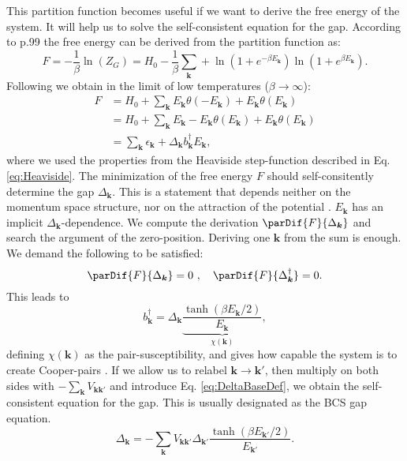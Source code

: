 \documentclass[../main.tex]{subfile}
\begin{document}
This partition function becomes useful if we want to derive the free energy of the system. It will help us to solve the self-consistent equation for the gap.
According to \cite{FuchsBaugaertel2023} p.99 the free energy can be derived from the partition function as:
\[
    F = -\frac{1}{\beta}\ln(Z_G) = H_0 -\frac{1}{\beta}\sum_{\bm{k}} + \ln\left(1 + e^{-\beta E_{\bm{k}}}\right)\ln\left(1 + e^{\beta E_{\bm{k}}}\right).
\]
Following \cite{FossheimSudbo2004} we obtain in the limit of low temperatures ($\beta\rightarrow \infty$):
\begin{align*}
    F &= H_0 + \sum_{\bm{k}} E_{\bm{k}} \theta\left(-E_{\bm{k}}\right) + E_{\bm{k}} \theta\left(E_{\bm{k}}\right)\\
      &= H_0 + \sum_{\bm{k}} E_{\bm{k}} - E_{\bm{k}}\theta\left(E_{\bm{k}}\right) + E_{\bm{k}} \theta\left(E_{\bm{k}}\right)\\
      &= \sum_{\bm{k}} \epsilon_{\bm{k}} + \Delta_{\bm{k}}b_{\bm{k}}^{\dagger} E_{\bm{k}},
\end{align*}
where we used the properties from the Heaviside step-function described in Eq. \ref{eq:Heaviside}.
The minimization of the free energy $F$ should self-consitently determine the gap $\Delta_{\bm{k}}$. This is a statement that depends neither on the momentum space structure,
nor on the attraction of the potential \cite{FossheimSudbo2004}. $E_{\bm{k}}$ has an implicit $\Delta_{\bm{k}}$-dependence.
We compute the derivation $\parDif{F}{\Delta_{\bm{k}}}$ and search the argument of the zero-position. Deriving one $\bm{k} $ from the sum is enough. We demand the following
to be satisfied:
\begin{equation}
    \parDif{F}{\Delta_{\bm{k}}} = 0 ~,~~~ \parDif{F}{\Delta_{\bm{k}}^{\dagger}} = 0.
\end{equation}
This leads to
\begin{equation*}
    b_{\bm{k}}^{\dagger} = \Delta_{\bm{k}} \underbrace{\frac{\tanh(\beta E_{\bm{k}}/2)}{E_{\bm{k}}}}_{\chi(\bm{k})},
\end{equation*}
defining $\chi(\bm{k})$ as the pair-susceptibility, and gives how capable the system is to create Cooper-pairs \cite{FossheimSudbo2004}. If we allow us to relabel 
$\bm{k}\rightarrow\bm{k}'$, then multiply on both sides
with $-\sum_{\bm{k}} V_{\bm{k}\bm{k}'}$ and introduce Eq. \ref{eq:DeltaBaseDef}, we obtain the self-consistent equation for the gap. This is usually designated as the BCS gap equation.
\begin{equation}\label{eq:BCS_gap_eq}
    \Delta_{\bm{k}} = -\sum_{\bm{k}} V_{\bm{k}\bm{k}'} \Delta_{\bm{k}'}\frac{\tanh(\beta E_{\bm{k}'}/2)}{E_{\bm{k}'}}.
\end{equation}
\end{document}
